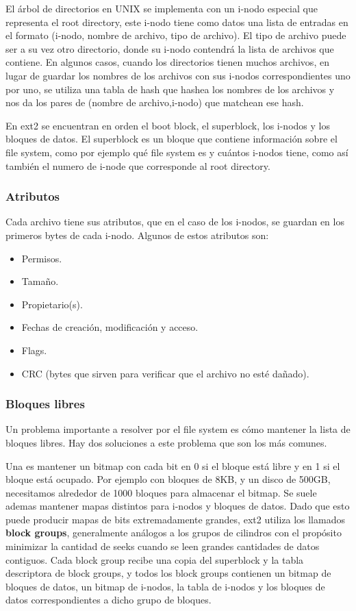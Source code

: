 \documentclass{article}
\begin{document}
El \'arbol de directorios en UNIX se implementa con un i-nodo especial que representa el root directory, este i-nodo tiene como datos una lista de entradas en el formato (i-nodo, nombre de archivo, tipo de archivo). El tipo de archivo puede ser a su vez otro directorio, donde su i-nodo contendrá la lista de archivos que contiene. En algunos casos, cuando los directorios tienen muchos archivos, en lugar de guardar los nombres de los archivos con sus i-nodos correspondientes uno por uno, se utiliza una tabla de hash que hashea los nombres de los archivos y nos da los pares de (nombre de archivo,i-nodo) que matchean ese hash.

En ext2 se encuentran en orden el boot block, el superblock, los i-nodos y los bloques de datos. El superblock es un bloque que contiene informaci\'on sobre el file system, como por ejemplo qu\'e file system es y cu\'antos i-nodos tiene, como así también el numero de i-node que corresponde al root directory.

\subsubsection{Atributos}

Cada archivo tiene sus atributos, que en el caso de los i-nodos, se guardan en los primeros bytes de cada i-nodo. Algunos de estos atributos son:

\begin{itemize}
\item Permisos.
\item Tama\~no.
\item Propietario(s).
\item Fechas de creaci\'on, modificaci\'on y acceso.
\item Flags.
\item CRC (bytes que sirven para verificar que el archivo no est\'e da\~nado).
\end{itemize}

\subsubsection{Bloques libres}

Un problema importante a resolver por el file system es c\'omo mantener la lista de bloques libres. Hay dos soluciones a este problema que son los m\'as comunes. 

Una es mantener un bitmap con cada bit en 0 si el bloque est\'a libre y en 1 si el bloque est\'a ocupado. Por ejemplo con bloques de 8KB, y un disco de 500GB, necesitamos alrededor de 1000 bloques para almacenar el bitmap. Se suele ademas mantener mapas distintos para i-nodos y bloques de datos. Dado que esto puede producir mapas de bits extremadamente grandes, ext2 utiliza los llamados \textbf{block groups}, generalmente análogos a los grupos de cilindros con el propósito minimizar la cantidad de seeks cuando se leen grandes cantidades de datos contiguos. Cada block group recibe una copia del superblock y la tabla descriptora de block groups, y todos los block groups contienen un bitmap de bloques de datos, un bitmap de i-nodos, la tabla de i-nodos y los bloques de datos correspondientes a dicho grupo de bloques.
\end{document}
